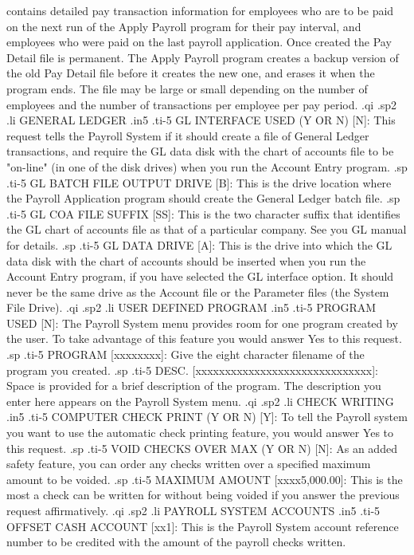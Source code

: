 contains detailed pay transaction
information for employees who are to be paid on the next run of the
Apply Payroll program for their pay interval,
and employees who were paid on the last
payroll application.  Once created the Pay Detail file is permanent.
The Apply Payroll program creates a
backup version of the old Pay Detail file before it creates the new one,
and erases it when the program ends.
The file may be
large or small depending on the number of employees and the number of
transactions per employee per pay period.
.qi
.sp2
.li
GENERAL LEDGER
.in5
.ti-5
GL INTERFACE USED (Y OR N) [N]:  This request tells the Payroll System
if it should create a file of General Ledger transactions,
and require the GL data disk with the chart of
accounts file to be "on-line" (in one of the disk drives)
when you run the Account Entry program.
.sp
.ti-5
GL BATCH FILE OUTPUT DRIVE [B]: This is the drive location where the
Payroll Application program should create the General Ledger batch file.
.sp
.ti-5
GL COA FILE SUFFIX [SS]: This is the two character suffix that identifies
the GL chart of accounts file as that of a particular company.	See you
GL manual for details.
.sp
.ti-5
GL DATA DRIVE [A]: This is the drive into which the GL data disk with the chart
of accounts should be inserted when you run the Account Entry
program, if you have selected the GL interface option.	It should never be
the same drive as the Account file or the Parameter files (the System File
Drive).
.qi
.sp2
.li
USER DEFINED PROGRAM
.in5
.ti-5
PROGRAM USED [N]: The Payroll System menu provides room for one program
created by the user.  To take advantage of this feature you would answer
Yes to this request.
.sp
.ti-5
PROGRAM [xxxxxxxx]: Give the eight character filename of the program you
created.
.sp
.ti-5
DESC. [xxxxxxxxxxxxxxxxxxxxxxxxxxxxxx]: Space is provided for a brief
description of the program. The description you enter here appears
on the Payroll System menu.
.qi
.sp2
.li
CHECK WRITING
.in5
.ti-5
COMPUTER CHECK PRINT (Y OR N) [Y]: To tell the Payroll system you want
to use the automatic check printing feature, you would answer Yes to this
request.
.sp
.ti-5
VOID CHECKS OVER MAX (Y OR N) [N]: As an added safety feature, you can
order any checks written over a specified maximum amount to be voided.
.sp
.ti-5
MAXIMUM AMOUNT [xxxx5,000.00]:	This is the most a check can be written
for without being voided if you answer the previous request affirmatively.
.qi
.sp2
.li
PAYROLL SYSTEM ACCOUNTS
.in5
.ti-5
OFFSET CASH ACCOUNT [xx1]: This is the Payroll System account reference
number to be credited with the amount of the payroll checks written.
